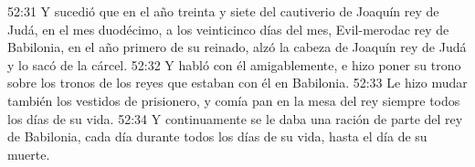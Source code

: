 52:31 Y sucedió que en el año treinta y siete del cautiverio de Joaquín rey de Judá, en el mes duodécimo, a los veinticinco días del mes, Evil-merodac rey de Babilonia, en el año primero de su reinado, alzó la cabeza de Joaquín rey de Judá y lo sacó de la cárcel.  
52:32 Y habló con él amigablemente, e hizo poner su trono sobre los tronos de los reyes que estaban con él en Babilonia.  
52:33 Le hizo mudar también los vestidos de prisionero, y comía pan en la mesa del rey siempre todos los días de su vida.  
52:34 Y continuamente se le daba una ración de parte del rey de Babilonia, cada día durante todos los días de su vida, hasta el día de su muerte.


